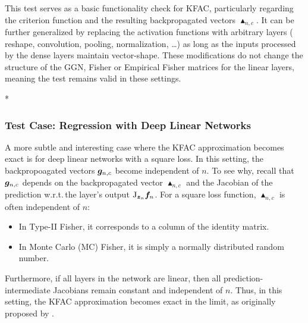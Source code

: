 This test serves as a basic functionality check for KFAC, particularly regarding the criterion function and the resulting backpropagated vectors $\blacktriangle_{n,c}$.
It can be further generalized by replacing the activation functions with arbitrary layers (\eg\,reshape, convolution, pooling, normalization, \dots) as long as the inputs processed by the dense layers maintain vector-shape.
These modifications do not change the structure of the GGN, Fisher or Empirical Fisher matrices for the linear layers, meaning the test remains valid in these settings.


\switchcolumn[1]*
\switchcolumn[0]

\subsubsection{Test Case: Regression with Deep Linear Networks}

A more subtle and interesting case where the KFAC approximation becomes exact is for deep linear networks with a square loss. 
In this setting, the backpropoagated vectors ${\bm{g}}_{n,c}$ become independent of $n$.
To see why, recall that ${\bm{g}}_{n,c}$ depends on the backpropagated vector $\blacktriangle_{n,c}$ and the Jacobian of the prediction w.r.t.\,the layer's output $\mathrm{J}_{{\bm{z}}_n} {\bm{f}}_n$.
For a square loss function, $\blacktriangle_{n,c}$ is often independent of $n$: 
\begin{itemize}
\item In Type-II Fisher, it corresponds to a column of the identity matrix.
\item In Monte Carlo (MC) Fisher, it is simply a normally distributed random number.
\end{itemize}
Furthermore, if all layers in the network are linear, then all prediction-intermediate Jacobians remain constant and independent of $n$. 
Thus, in this setting, the KFAC approximation becomes exact in the limit, as originally proposed by \cite{bernacchia2018exact}.

